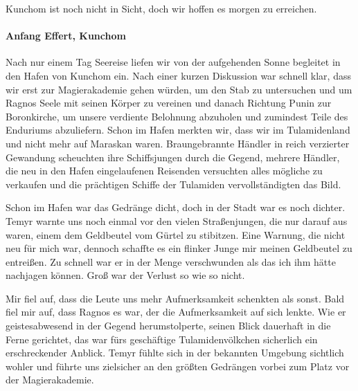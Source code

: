 Kunchom ist noch nicht in Sicht, doch wir hoffen es morgen zu erreichen.

\paragraph{Anfang Effert, Kunchom}
Nach nur einem Tag Seereise liefen wir von der aufgehenden Sonne begleitet in den Hafen von Kunchom ein. Nach einer kurzen Diskussion war schnell klar, dass wir erst zur Magierakademie gehen würden, um den Stab zu untersuchen und um Ragnos Seele mit seinen Körper zu vereinen und danach Richtung Punin zur Boronkirche, um unsere verdiente Belohnung abzuholen und zumindest Teile des Enduriums abzuliefern. Schon im Hafen merkten wir, dass wir im Tulamidenland und nicht mehr auf Maraskan waren. Braungebrannte Händler in reich verzierter Gewandung scheuchten ihre Schiffsjungen durch die Gegend, mehrere Händler, die neu in den Hafen eingelaufenen Reisenden versuchten alles mögliche zu verkaufen und die prächtigen Schiffe der Tulamiden vervollständigten das Bild. 

Schon im Hafen war das Gedränge dicht, doch in der Stadt war es noch dichter. Temyr warnte uns noch einmal vor den vielen Straßenjungen, die nur darauf aus waren, einem dem Geldbeutel vom Gürtel zu stibitzen. Eine Warnung, die nicht neu für mich war, dennoch schaffte es ein flinker Junge mir meinen Geldbeutel zu entreißen. Zu schnell war er in der Menge verschwunden als das ich ihm hätte nachjagen können. Groß war der Verlust so wie so nicht. 

Mir fiel auf, dass die Leute uns mehr Aufmerksamkeit schenkten als sonst. Bald fiel mir auf, dass Ragnos es war, der die Aufmerksamkeit auf sich lenkte. Wie er geistesabwesend in der Gegend herumstolperte, seinen Blick dauerhaft in die Ferne gerichtet, das war fürs geschäftige Tulamidenvölkchen sicherlich ein erschreckender Anblick. Temyr fühlte sich in der bekannten Umgebung sichtlich wohler und führte uns zielsicher an den größten Gedrängen vorbei zum Platz vor der Magierakademie. 

